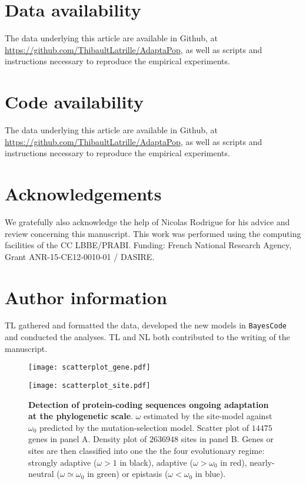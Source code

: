 \documentclass{article}
\begin{document}
\section{Data availability}
The data underlying this article are available in Github, at \url{https://github.com/ThibaultLatrille/AdaptaPop}, as well as scripts and instructions necessary to reproduce the empirical experiments.

\section{Code availability}
The data underlying this article are available in Github, at \url{https://github.com/ThibaultLatrille/AdaptaPop}, as well as scripts and instructions necessary to reproduce the empirical experiments.

\section{Acknowledgements}
We gratefully also acknowledge the help of Nicolas Rodrigue for his advice and review concerning this manuscript.
This work was performed using the computing facilities of the CC LBBE/PRABI.
Funding: French National Research Agency, Grant ANR-15-CE12-0010-01 / DASIRE.

\section{Author information}
TL gathered and formatted the data, developed the new models in \texttt{BayesCode} and conducted the analyses.
TL and NL both contributed to the writing of the manuscript.

\printbibliography

\begin{figure*}[h!]
	\centering
	\begin{minipage}{0.49\linewidth}
		\texttt{[image: scatterplot\_gene.pdf]}
	\end{minipage}
	\hfill
	\begin{minipage}{0.49\linewidth}
		\texttt{[image: scatterplot\_site.pdf]}
	\end{minipage}
	\hfill
	\label{fig:scatterplot}
	\caption{ \textbf{Detection of protein-coding sequences ongoing adaptation at the phylogenetic scale}.
		$\omega$ estimated by the site-model against $\omega_{0}$ predicted by the mutation-selection model.
		Scatter plot of $14475$ genes in panel A. Density plot of $2636948$ sites in panel B.
		Genes or sites are then classified into one the the four evolutionary regime: strongly adaptive ($\omega > 1$ in black), adaptive ($\omega > \omega_{0}$ in red), nearly-neutral ($\omega \simeq \omega_{0}$ in green) or epistasis ($\omega < \omega_{0}$ in blue). }
\end{figure*}
\end{document}
